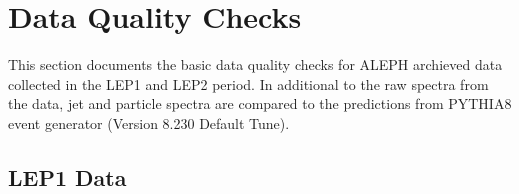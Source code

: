\section{Data Quality Checks}


This section documents the basic data quality checks for ALEPH archieved data collected in the LEP1 and LEP2 period. In additional to the raw spectra from the data, jet and particle spectra are compared to the predictions from PYTHIA8 event generator (Version 8.230 Default Tune). 



\subsection{LEP1 Data}

